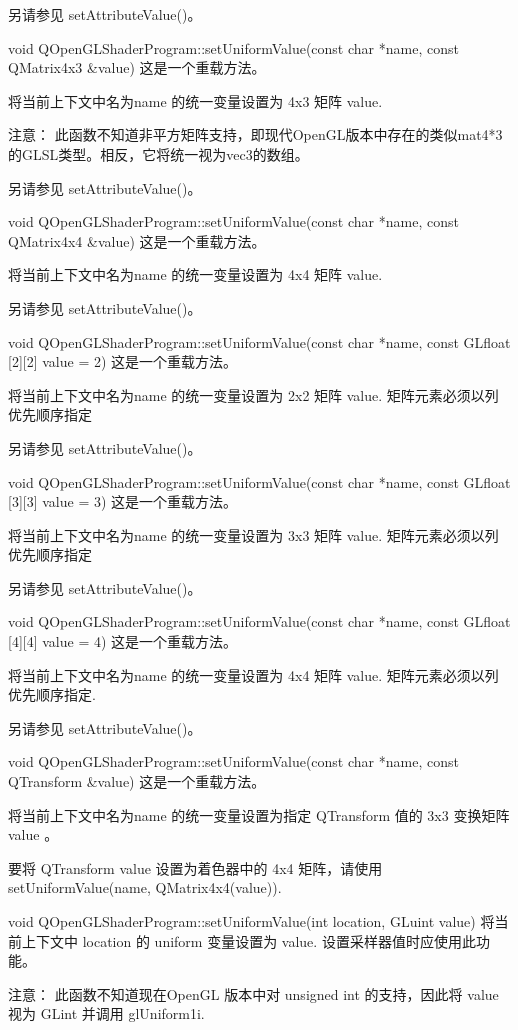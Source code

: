 另请参见 setAttributeValue()。

void QOpenGLShaderProgram::setUniformValue(const char *name, const QMatrix4x3 \&value)
这是一个重载方法。

将当前上下文中名为name 的统一变量设置为 4x3 矩阵 value.

注意： 此函数不知道非平方矩阵支持，即现代OpenGL版本中存在的类似mat4*3的GLSL类型。相反，它将统一视为vec3的数组。

另请参见 setAttributeValue()。

void QOpenGLShaderProgram::setUniformValue(const char *name, const QMatrix4x4 \&value)
这是一个重载方法。

将当前上下文中名为name 的统一变量设置为 4x4 矩阵 value.

另请参见 setAttributeValue()。

void QOpenGLShaderProgram::setUniformValue(const char *name, const GLfloat [2][2] value = 2)
这是一个重载方法。

将当前上下文中名为name 的统一变量设置为 2x2 矩阵 value. 矩阵元素必须以列优先顺序指定

另请参见 setAttributeValue()。

void QOpenGLShaderProgram::setUniformValue(const char *name, const GLfloat [3][3] value = 3)
这是一个重载方法。

将当前上下文中名为name 的统一变量设置为 3x3 矩阵 value. 矩阵元素必须以列优先顺序指定

另请参见 setAttributeValue()。

void QOpenGLShaderProgram::setUniformValue(const char *name, const GLfloat [4][4] value = 4)
这是一个重载方法。

将当前上下文中名为name 的统一变量设置为 4x4 矩阵 value. 矩阵元素必须以列优先顺序指定.

另请参见 setAttributeValue()。

void QOpenGLShaderProgram::setUniformValue(const char *name, const QTransform \&value)
这是一个重载方法。

将当前上下文中名为name 的统一变量设置为指定 QTransform 值的 3x3 变换矩阵 value 。

要将 QTransform value 设置为着色器中的 4x4 矩阵，请使用 setUniformValue(name, QMatrix4x4(value)).

void QOpenGLShaderProgram::setUniformValue(int location, GLuint value)
将当前上下文中 location 的 uniform 变量设置为 value. 设置采样器值时应使用此功能。

注意： 此函数不知道现在OpenGL 版本中对 unsigned int 的支持，因此将 value 视为 GLint 并调用 glUniform1i.

